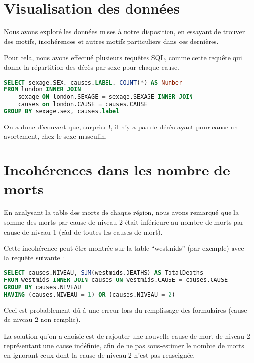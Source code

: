 \section{Visualisation des données}

    Nous avons exploré les données mises à notre disposition, en essayant de trouver des motifs, incohérences et autres motifs particuliers
    dans ces dernières.

    Pour cela, nous avons effectué plusieurs requêtes SQL, comme cette requête qui donne la répartition des décès par sexe pour chaque
    cause.

    \begin{lstlisting}[frame=single, language=SQL]
SELECT sexage.SEX, causes.LABEL, COUNT(*) AS Number
FROM london INNER JOIN
    sexage ON london.SEXAGE = sexage.SEXAGE INNER JOIN
    causes on london.CAUSE = causes.CAUSE
GROUP BY sexage.sex, causes.label
    \end{lstlisting}

    On a donc découvert que, surprise !, il n'y a pas de décès ayant pour cause un avortement, chez le sexe masculin.

\section{Incohérences dans les nombre de morts}

    En analysant la table des morts de chaque région, nous avons remarqué que la somme des morts par cause de niveau 2 était
    inférieure au nombre de morts par cause de niveau 1 (càd de toutes les causes de mort).

    Cette incohérence peut être montrée sur la table ``westmids'' (par exemple) avec la requête suivante :

    \begin{lstlisting}[frame=single, language=SQL]
SELECT causes.NIVEAU, SUM(westmids.DEATHS) AS TotalDeaths
FROM westmids INNER JOIN causes ON westmids.CAUSE = causes.CAUSE
GROUP BY causes.NIVEAU
HAVING (causes.NIVEAU = 1) OR (causes.NIVEAU = 2)
    \end{lstlisting}

    Ceci est probablement dû à une erreur lors du remplissage des formulaires (cause de niveau 2 non-remplie).

    La solution qu'on a choisie est de rajouter une nouvelle cause de mort de niveau 2 représentant une cause indéfinie, afin
    de ne pas sous-estimer le nombre de morts en ignorant ceux dont la cause de niveau 2 n'est pas renseignée.


